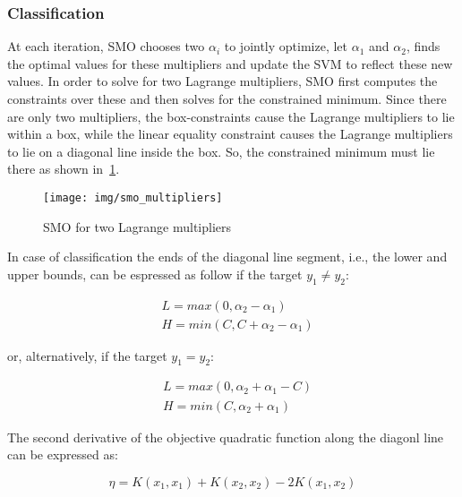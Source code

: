 \subsubsection{Classification}

At each iteration, SMO chooses two $\alpha_i$ to jointly optimize, let $\alpha_1$ and $\alpha_2$, finds the optimal values for these multipliers and update the SVM to reflect these new values. In order to solve for two Lagrange multipliers, SMO first computes the constraints over these and then solves for the constrained minimum. Since there are only two multipliers, the box-constraints cause the Lagrange multipliers to lie within a box, while the linear equality constraint causes the Lagrange multipliers to lie on a diagonal line inside the box. So, the constrained minimum must lie there as shown in~\ref{fig:smo_lagrange_multipliers}.

\begin{figure}[h!]
	\centering
	\texttt{[image: img/smo\_multipliers]}
	\caption{SMO for two Lagrange multipliers}
	\label{fig:smo_lagrange_multipliers}
\end{figure}

In case of classification the ends of the diagonal line segment, i.e., the lower and upper bounds, can be espressed as follow if the target $y_1 \ne y_2$:

\begin{equation} \label{eq:smo_svc_bounds_update1}
	\begin{aligned}
		& L = max(0, \alpha_2 - \alpha_1) \\
		& H = min(C, C + \alpha_2 - \alpha_1)
	\end{aligned}
\end{equation}

or, alternatively, if the target $y_1 = y_2$:

\begin{equation} \label{eq:smo_svc_bounds_update2}
	\begin{aligned}
		& L = max(0, \alpha_2 + \alpha_1 - C) \\
		& H = min(C, \alpha_2 + \alpha_1)
	\end{aligned}
\end{equation}

The second derivative of the objective quadratic function along the diagonl line can be expressed as:

\begin{equation} \label{eq:smo_eta}
	\eta = K(x_1, x_1) + K(x_2, x_2) - 2K(x_1, x_2)
\end{equation}

